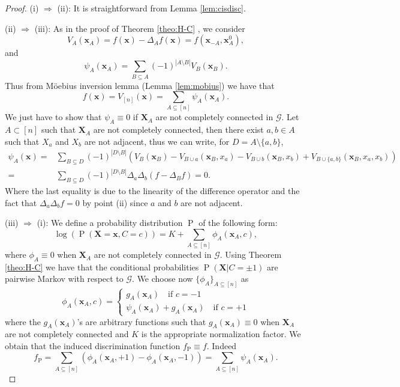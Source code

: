 \documentclass[11pt,a4paper, twoside]{book}
\newcommand{\bx}{\mathbf{x}}
\newcommand{\bX}{\mathbf{X}}
\begin{document}
\begin{proof}
(i) $\Rightarrow$ (ii): It is straightforward from Lemma \ref{lem:cisdisc}.

(ii) $\Rightarrow$ (iii): 
As in the proof of Theorem \ref{theo:H-C} \citep{lauritzen1996}, we consider
$$V_A(\mathbf{x}_A)= f (\bx)- \Delta_A f(\bx)=f(\bx_{-A},\bx^{0}_A), $$
and
$$ \psi_A(\mathbf{x}_A) = \sum_{B\subseteq A} (-1)^{|A\setminus B|}V_{B}(\mathbf{x}_B). $$
Thus from M\"{o}ebius inversion lemma (Lemma \ref{lem:mobius}) we have that
$$f(\mathbf{x})=V_{[n]}(\bx)=\sum_{A\subseteq [n]} \psi_A(\mathbf{x}_A).$$
We just have to show that $\psi_A \equiv 0$ if $\mathbf{X}_A$ are not completely connected in $\mathcal{G}$.
Let $A \subset [n]$ such that $\mathbf{X}_A$ are not completely connected, then there exist $a,b \in A$ such that $X_a$ and $X_b$ are not adjacent, thus we can write, for $D=A\setminus\{a,b\}$,
{\small
\begin{align*}
\psi_A(\mathbf{x}) = & \sum_{B\subseteq D} (-1)^{|D\setminus B|}\left(V_{B}(\mathbf{x}_B)-V_{B\cup a}(\mathbf{x}_B,x_a) - V_{B\cup b}(\mathbf{x}_B,x_b) + V_{B\cup \{a,b\}}(\mathbf{x}_B,x_a,x_b) \right)  \\ = & \sum_{B\subseteq D} (-1)^{|D\setminus B|} \Delta_{a} \Delta_{b} (f - \Delta_Bf)=0. 
\end{align*}
}
Where the last equality is due to the linearity of the difference operator and the fact that $\Delta_a\Delta_b f = 0$ by point (ii) since $a$ and $b$ are not adjacent.

(iii) $\Rightarrow$ (i): 
We define a probability distribution $\operatorname{P}$ of the following form:
\begin{equation}
\label{eq:modeldiscrete1}
\log \left(\operatorname{P}(\bX=\bx, C=c) \right) =  K + \sum_{A\subseteq [n]} \phi_{A}(\mathbf{x}_A,c),
\end{equation}
where $\phi_A \equiv 0$ when $\mathbf{X}_A$ are not completely connected in $\mathcal{G}$.
Using Theorem \ref{theo:H-C} we have that the conditional probabilities $\operatorname{P}(\bX|C=\pm 1)$ are pairwise Markov with respect to $\mathcal{G}$.
 We choose now $\{ \phi_A\}_{A\subseteq [n]}$ as
\begin{equation}
\label{eq:modeldiscrete}
\phi_A(\mathbf{x}_A,c) =\left\{ \begin{array}{cc}
g_A(\mathbf{x}_A) \quad \text{if } c=-1 \\
\psi_A(\mathbf{x}_A) + g_A(\mathbf{x}_A) \quad \text{if } c=+1 
\end{array} \right.
\end{equation}
where the $g_A(\mathbf{x}_A)$'s are arbitrary functions such that $g_A(\mathbf{x}_A) \equiv 0$ when $\mathbf{X}_A$ are not completely connected and $K$ is the appropriate normalization factor.
We obtain that the induced discrimination function $f_{\operatorname{P}} \equiv f$. Indeed
$$ f_{\operatorname{P}} = \sum_{A\subseteq [n]} \left(\phi_{A}(\mathbf{x}_A,+1) - \phi_{A}(\mathbf{x}_A,-1) \right) =  \sum_{A\subseteq [n]} \psi_A(\mathbf{x}_A).$$

\end{proof}
\end{document}
